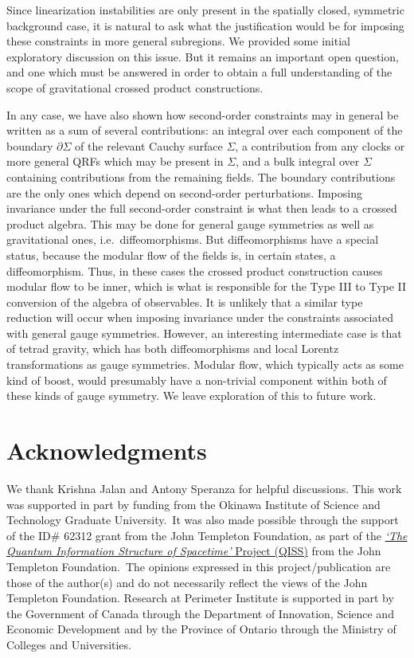 \documentclass[]{jkpaper}
\theoremstyle{plain}
\theoremstyle{definition}
\begin{document}
Since linearization instabilities are only present in the spatially closed, symmetric background case, it is natural to ask what the justification would be for imposing these constraints in more general subregions. We provided some initial exploratory discussion on this issue. But it remains an important open question, and one which must be answered in order to obtain a full understanding of the scope of gravitational crossed product constructions.

In any case, we have also shown how second-order constraints may in general be written as a sum of several contributions: an integral over each component of the boundary $\partial\Sigma$ of the relevant Cauchy surface $\Sigma$, a contribution from any clocks or more general QRFs which may be present in $\Sigma$, and a bulk integral over $\Sigma$ containing contributions from the remaining fields. The boundary contributions are the only ones which depend on second-order perturbations. Imposing invariance under the full second-order constraint is what then leads to a crossed product algebra. This may be done for general gauge symmetries as well as gravitational ones, i.e.\ diffeomorphisms. But diffeomorphisms have a special status, because the modular flow of the fields is, in certain states, a diffeomorphism. Thus, in these cases the crossed product construction causes modular flow to be inner, which is what is responsible for the Type III to Type II conversion of the algebra of observables. It is unlikely that a similar type reduction will occur when imposing invariance under the constraints associated with general gauge symmetries. However, an interesting intermediate case is that of tetrad gravity, which has both diffeomorphisms and local Lorentz transformations as gauge symmetries. Modular flow, which typically acts as some kind of boost, would presumably have a non-trivial component within both of these kinds of gauge symmetry. We leave exploration of this to future work.

{}
\section*{Acknowledgments}

We thank Krishna Jalan and Antony Speranza for helpful discussions.
This work was supported in part by funding from the Okinawa Institute of Science and Technology Graduate University.~It was also made possible through the support of the ID\# 62312 grant from the John Templeton Foundation, as part of the \href{https://www.templeton.org/grant/the-quantum-information-structure-of-spacetime-qiss-second-phase}{\textit{`The Quantum Information Structure of Spacetime'} Project (QISS)} from the John Templeton Foundation.~The opinions expressed in this project/publication are those of the author(s) and do not necessarily reflect the views of the John Templeton Foundation. Research at Perimeter Institute is supported in part by the Government of Canada through the Department of Innovation, Science and Economic Development and by the Province of Ontario through the Ministry of Colleges and Universities.
\end{document}
